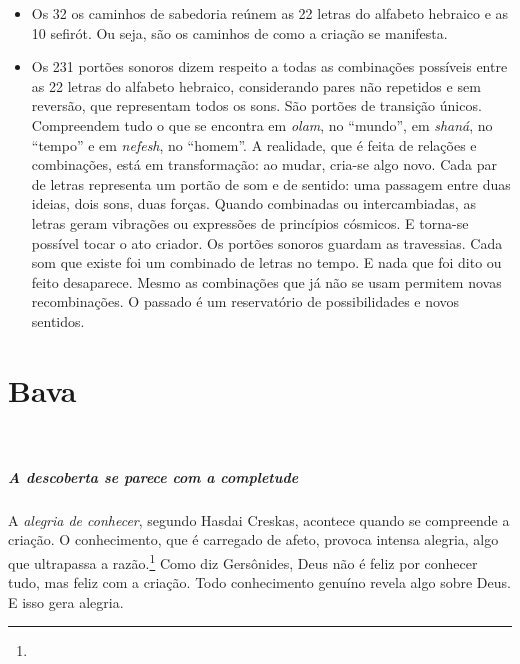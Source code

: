 \begin{itemize}
\item Os 32 os caminhos de sabedoria reúnem as 22 letras do alfabeto hebraico e as 10 sefirót. Ou seja, são os caminhos de como a criação se manifesta.

\item Os 231 portões sonoros dizem respeito a todas as combinações possíveis entre as 22 letras do alfabeto hebraico, considerando pares não repetidos e sem reversão, que representam todos os sons. São portões de transição únicos. Compreendem tudo o que se encontra em \textit{olam}, no ``mundo'', em \textit{shaná}, no ``tempo'' e em \textit{nefesh}, no ``homem''. A realidade, que é feita de relações e combinações, está em transformação: ao mudar, cria-se algo novo. Cada par de letras representa um portão de som e de sentido: uma passagem entre duas ideias, dois sons, duas forças. Quando combinadas ou intercambiadas, as letras geram vibrações ou expressões de princípios cósmicos. E torna-se possível tocar o ato criador. Os portões sonoros guardam as travessias. Cada som que existe foi um combinado de letras no tempo. E nada que foi dito ou feito desaparece. Mesmo as combinações que já não se usam permitem novas recombinações. O passado é um reservatório de possibilidades e novos sentidos.
\end{itemize}

\chapter*{Bava 
\smallskip{}}

\begin{center}
{\huge{}}\\\medskip{\footnotesize\formularlight{
\lipsum[2]
}}
\end{center}

\paragraph{A descoberta se parece com a completude} A \textit{alegria de conhecer}, segundo Hasdai Creskas, acontece quando se compreende a criação. O conhecimento, que é carregado de afeto, provoca intensa alegria, algo que ultrapassa a razão.\footnote{} Como diz Gersônides, Deus não é feliz por conhecer tudo, mas feliz com a criação. Todo conhecimento genuíno revela algo sobre Deus. E isso gera alegria.

